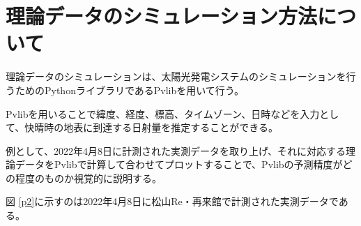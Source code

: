 \documentclass[a4j,12pt,]{jarticle}
\begin{document}
\section{理論データのシミュレーション方法について}
理論データのシミュレーションは、太陽光発電システムのシミュレーションを行うためのPythonライブラリであるPvlibを用いて行う。

Pvlibを用いることで緯度、経度、標高、タイムゾーン、日時などを入力として、快晴時の地表に到達する日射量を推定することができる。

例として、2022年4月8日に計測された実測データを取り上げ、それに対応する理論データをPvlibで計算して合わせてプロットすることで、Pvlibの予測精度がどの程度のものか視覚的に説明する。




図 \ref{p2}に示すのは2022年4月8日に松山Re・再来館で計測された実測データである。
\end{document}
